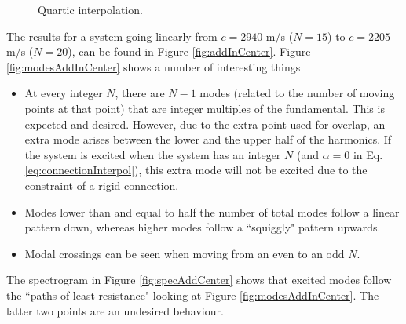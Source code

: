 \documentclass[dvipsnames]{article}
\begin{document}
\begin{figure}[h]
    \centering
    \hspace{0.05\textwidth}
    \caption{Quartic interpolation.}\label{fig:quartSpecAddInCenter}
\end{figure}


The results for a system going linearly from $c=2940$ m/s ($N=15$) to $c = 2205$ m/s ($N=20$), can be found in Figure \ref{fig:addInCenter}. Figure \ref{fig:modesAddInCenter} shows a number of interesting things 
\begin{itemize}
    \item At every integer $N$, there are $N-1$ modes (related to the number of moving points at that point) that are integer multiples of the fundamental. This is expected and desired. However, due to the extra point used for overlap, an extra mode arises between the lower and the upper half of the harmonics. If the system is excited when the system has an integer $N$ (and $\alpha = 0$ in Eq. \eqref{eq:connectionInterpol}), this extra mode will not be excited due to the constraint of a rigid connection. 
    \item Modes lower than and equal to half the number of total modes follow a linear pattern down, whereas higher modes follow a ``squiggly" pattern upwards.
    \item Modal crossings can be seen when moving from an even to an odd $N$.
\end{itemize}
The spectrogram in Figure \ref{fig:specAddCenter} shows that excited modes follow the ``paths of least resistance" looking at Figure \ref{fig:modesAddInCenter}. The latter two points are an undesired behaviour. 
\end{document}
